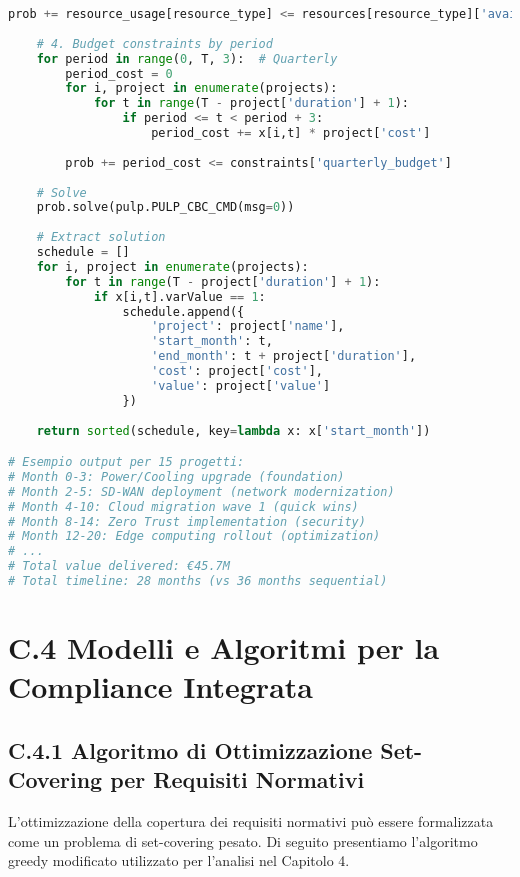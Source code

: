 \begin{lstlisting}[language=Python, caption=Algoritmo di Scheduling con Vincoli]
            prob += resource_usage[resource_type] <= resources[resource_type]['available']
    
    # 4. Budget constraints by period
    for period in range(0, T, 3):  # Quarterly
        period_cost = 0
        for i, project in enumerate(projects):
            for t in range(T - project['duration'] + 1):
                if period <= t < period + 3:
                    period_cost += x[i,t] * project['cost']
        
        prob += period_cost <= constraints['quarterly_budget']
    
    # Solve
    prob.solve(pulp.PULP_CBC_CMD(msg=0))
    
    # Extract solution
    schedule = []
    for i, project in enumerate(projects):
        for t in range(T - project['duration'] + 1):
            if x[i,t].varValue == 1:
                schedule.append({
                    'project': project['name'],
                    'start_month': t,
                    'end_month': t + project['duration'],
                    'cost': project['cost'],
                    'value': project['value']
                })
    
    return sorted(schedule, key=lambda x: x['start_month'])

# Esempio output per 15 progetti:
# Month 0-3: Power/Cooling upgrade (foundation)
# Month 2-5: SD-WAN deployment (network modernization)  
# Month 4-10: Cloud migration wave 1 (quick wins)
# Month 8-14: Zero Trust implementation (security)
# Month 12-20: Edge computing rollout (optimization)
# ...
# Total value delivered: €45.7M
# Total timeline: 28 months (vs 36 months sequential)
\end{lstlisting}

\section{\texorpdfstring{\textbf{C.4 Modelli e Algoritmi per la Compliance Integrata}}{C.4 - Modelli e Algoritmi per la Compliance Integrata}}

\subsection{\texorpdfstring{\textbf{C.4.1 Algoritmo di Ottimizzazione Set-Covering per Requisiti Normativi}}{C.4.1 - Algoritmo di Ottimizzazione Set-Covering per Requisiti Normativi}}

L'ottimizzazione della copertura dei requisiti normativi può essere formalizzata come un problema di set-covering pesato. Di seguito presentiamo l'algoritmo greedy modificato utilizzato per l'analisi nel Capitolo 4.

